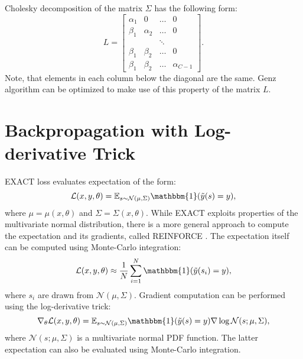 \documentclass[nohyperref]{article}
\theoremstyle{plain}
\theoremstyle{definition}
\theoremstyle{remark}
\begin{document}
Cholesky decomposition of the matrix $\Sigma$ has the following form:
\begin{equation}
L = \begin{bmatrix}
  \alpha_1 & 0 & \dots & 0 \\
  \beta_1 & \alpha_2 & \dots & 0 \\
  & & \ddots & \\
  \beta_1 & \beta_2 & \dots & 0 \\
  \beta_1 & \beta_2 & \dots & \alpha_{C-1}
\end{bmatrix}.
\end{equation}
Note, that elements in each column below the diagonal are the same. Genz algorithm can be optimized to make use of this property of the matrix $L$.

\section{Backpropagation with Log-derivative Trick}

EXACT loss evaluates expectation of the form:
\begin{equation}
    \mathcal{L}(x, y, \theta) = \mathbb{E}_{s \sim \mathcal{N}(\mu, \Sigma)}\mathbbm{1}(\tilde{y}(s) = y),
\end{equation}
where $\mu = \mu(x, \theta)$ and $\Sigma = \Sigma(x, \theta)$.
While EXACT exploits properties of the multivariate normal distribution, there is a more general approach to compute the expectation and its gradients, called REINFORCE \cite{williams1992reinforce}. The expectation itself can be computed using Monte-Carlo integration:
\begin{equation}
    \mathcal{L}(x, y, \theta)  \approx \frac{1}{N}\sum\limits_{i = 1}^N \mathbbm{1}(\tilde{y}(s_i) = y),
\end{equation}
where $s_i$ are drawn from $\mathcal{N}(\mu, \Sigma)$. Gradient computation can be performed using the log-derivative trick:
\begin{equation}
    \nabla_\theta \mathcal{L}(x, y, \theta) = \mathbb{E}_{s \sim \mathcal{N}(\mu, \Sigma)}\mathbbm{1}(\tilde{y}(s) = y)\nabla\log \mathcal{N}(s;\mu, \Sigma),
\end{equation}
where $\mathcal{N}(s;\mu, \Sigma)$ is a multivariate normal PDF function. The latter expectation can also be evaluated using Monte-Carlo integration.
\end{document}
